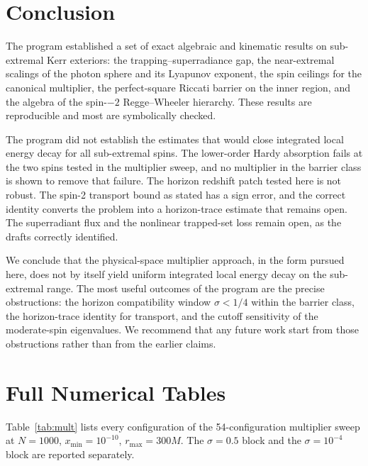 \documentclass[11pt, a4paper]{article}
\theoremstyle{remark}
\theoremstyle{definition}
\begin{document}
\section{Conclusion}
\label{sec:conclusion}

The program established a set of exact algebraic and kinematic results on sub-extremal Kerr exteriors: the trapping--superradiance gap, the near-extremal scalings of the photon sphere and its Lyapunov exponent, the spin ceilings for the canonical multiplier, the perfect-square Riccati barrier on the inner region, and the algebra of the spin-$-2$ Regge--Wheeler hierarchy. These results are reproducible and most are symbolically checked.

The program did not establish the estimates that would close integrated local energy decay for all sub-extremal spins. The lower-order Hardy absorption fails at the two spins tested in the multiplier sweep, and no multiplier in the barrier class is shown to remove that failure. The horizon redshift patch tested here is not robust. The spin-2 transport bound as stated has a sign error, and the correct identity converts the problem into a horizon-trace estimate that remains open. The superradiant flux and the nonlinear trapped-set loss remain open, as the drafts correctly identified.

We conclude that the physical-space multiplier approach, in the form pursued here, does not by itself yield uniform integrated local energy decay on the sub-extremal range. The most useful outcomes of the program are the precise obstructions: the horizon compatibility window $\sigma<1/4$ within the barrier class, the horizon-trace identity for transport, and the cutoff sensitivity of the moderate-spin eigenvalues. We recommend that any future work start from those obstructions rather than from the earlier claims.

\appendix
\section{Full Numerical Tables}
\label{sec:appA}

Table~\ref{tab:mult} lists every configuration of the 54-configuration multiplier sweep at $N=1000$, $x_{\min}=10^{-10}$, $r_{\max}=300M$. The $\sigma=0.5$ block and the $\sigma=10^{-4}$ block are reported separately.
\end{document}
